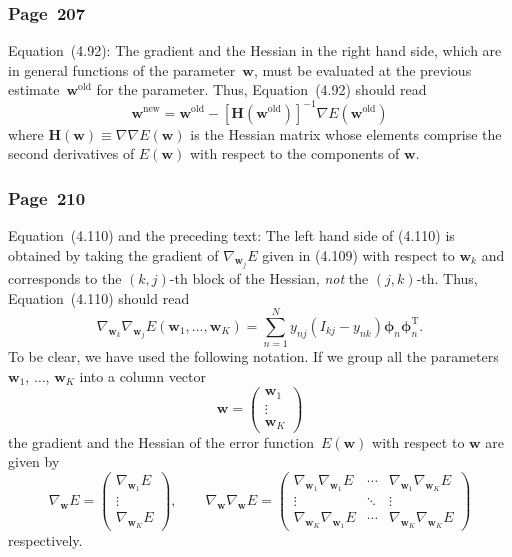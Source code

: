 \documentclass[12pt,a4paper]{article}
\newcommand{\erratum}[1]{\subsubsection*{#1}}
\begin{document}
\erratum{Page~207}
Equation~(4.92):
The gradient and the Hessian in the right hand side,
which are in general functions of the parameter~$\mathbf{w}$,
must be evaluated at the previous estimate~$\mathbf{w}^{\text{old}}$ for the parameter.
Thus, Equation~(4.92) should read
\begin{equation}
\mathbf{w}^{\text{new}} = \mathbf{w}^{\text{old}} -
  \left[ \mathbf{H} \left( \mathbf{w}^{\text{old}} \right) \right]^{-1}
  \nabla E \left( \mathbf{w}^{\text{old}} \right)
\end{equation}
where $\mathbf{H}\left(\mathbf{w}\right) \equiv \nabla\nabla E\left(\mathbf{w}\right)$ is
the Hessian matrix whose elements comprise the second derivatives of $E\left(\mathbf{w}\right)$
with respect to the components of $\mathbf{w}$.

\erratum{Page~210}
Equation~(4.110) and the preceding text:
The left hand side of (4.110) is obtained by taking the gradient of $\nabla_{\mathbf{w}_{j}} E$
given in (4.109) with respect to $\mathbf{w}_{k}$ and corresponds to
the $(k, j)$-th block of the Hessian, \emph{not} the $(j, k)$-th.
Thus, Equation~(4.110) should read
\begin{equation}
\nabla_{\mathbf{w}_{k}} \nabla_{\mathbf{w}_{j}}
E \left( \mathbf{w}_{1}, \dots, \mathbf{w}_{K} \right)
  = \sum_{n=1}^{N} y_{nj} \left( I_{kj} - y_{nk} \right)
    \bm{\phi}_{n} \bm{\phi}_{n}^{\operatorname{T}}.
\end{equation}
To be clear, we have used the following notation.
If we group all the parameters~$\mathbf{w}_{1}$, $\dots$, $\mathbf{w}_{K}$ into
a column vector
\begin{equation}
\mathbf{w} =
  \begin{pmatrix}
  \mathbf{w}_{1} \\
  \vdots \\
  \mathbf{w}_{K}
  \end{pmatrix}
\end{equation}
the gradient and the Hessian of the error function~$E\left(\mathbf{w}\right)$ with respect to
$\mathbf{w}$ are given by
\begin{equation}
\nabla_{\mathbf{w}} E =
  \begin{pmatrix}
  \nabla_{\mathbf{w}_{1}} E \\
  \vdots \\
  \nabla_{\mathbf{w}_{K}} E
  \end{pmatrix} , \qquad
\nabla_{\mathbf{w}} \nabla_{\mathbf{w}} E =
  \begin{pmatrix}
  \nabla_{\mathbf{w}_{1}} \nabla_{\mathbf{w}_{1}} E &
  \cdots &
  \nabla_{\mathbf{w}_{1}} \nabla_{\mathbf{w}_{K}} E \\
  \vdots & \ddots & \vdots \\
  \nabla_{\mathbf{w}_{K}} \nabla_{\mathbf{w}_{1}} E &
  \cdots &
  \nabla_{\mathbf{w}_{K}} \nabla_{\mathbf{w}_{K}} E
  \end{pmatrix}
\end{equation}
respectively.
\end{document}
